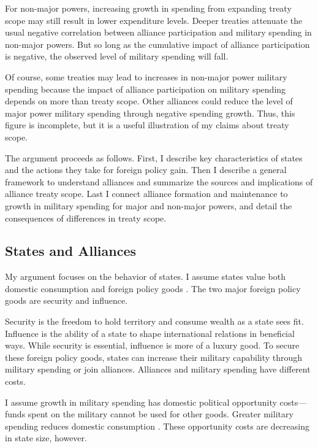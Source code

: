 \documentclass[12pt]{article}
\begin{document}
For non-major powers, increasing growth in spending from expanding treaty scope may still result in lower expenditure levels. 
Deeper treaties attenuate the usual negative correlation between alliance participation and military spending in non-major powers. 
But so long as the cumulative impact of alliance participation is negative, the observed level of military spending will fall. 


Of course, some treaties may lead to increases in non-major power military spending because the impact of alliance participation on military spending depends on more than treaty scope. 
Other alliances could reduce the level of major power military spending through negative spending growth.
Thus, this figure is incomplete, but it is a useful illustration of my claims about treaty scope. 


The argument proceeds as follows.
First, I describe key characteristics of states and the actions they take for foreign policy gain. 
Then I describe a general framework to understand alliances and summarize the sources and implications of alliance treaty scope. 
Last I connect alliance formation and maintenance to growth in military spending for major and non-major powers, and detail the consequences of differences in treaty scope.  



\subsection{States and Alliances}


My argument focuses on the behavior of states. 
I assume states value both domestic consumption and foreign policy goods \citep{Powell1993, Fearon2018}. 
The two major foreign policy goods are security and influence. 


Security is the freedom to hold territory and consume wealth as a state sees fit. 
Influence is the ability of a state to shape international relations in beneficial ways. 
While security is essential, influence is more of a luxury good. 
To secure these foreign policy goods, states can increase their military capability through military spending or join alliances. 
Alliances and military spending have different costs. 


I assume growth in military spending has domestic political opportunity costs--- funds spent on the military cannot be used for other goods. 
Greater military spending reduces domestic consumption \citep{Fearon2018}. 
These opportunity costs are decreasing in state size, however. 
\end{document}
